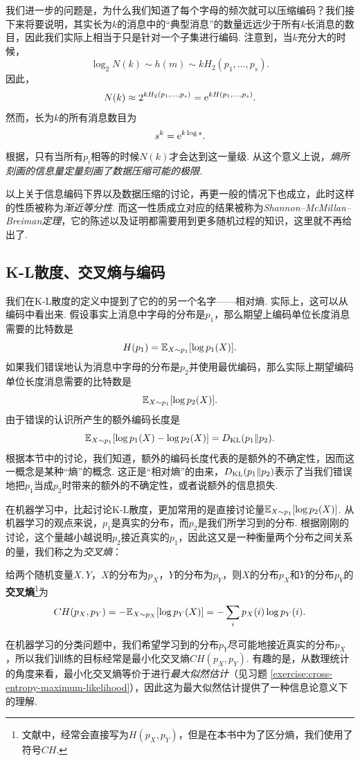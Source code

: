 我们进一步的问题是，为什么我们知道了每个字母的频次就可以压缩编码？我们接下来将要说明，其实长为$k$的消息中的“典型消息”的数量远远少于所有$k$长消息的数目，因此我们实际上相当于只是针对一个子集进行编码. 注意到，当$k$充分大的时候，
\[\log_2 N(k)\sim h(m)\sim kH_2(p_1,\dots,p_s).\]
因此，
\[N(k)\approx 2^{kH_2(p_1,\dots,p_s)}=\mathrm{e}^{kH(p_1,\dots,p_s)}.\]
然而，长为$k$的所有消息数目为
\[s^k=\mathrm{e}^{k\log s}.\]
根据，只有当所有$p_i$相等的时候$N(k)$才会达到这一量级. 从这个意义上说，\textit{熵所刻画的信息量定量刻画了数据压缩可能的极限.}

以上关于信息编码下界以及数据压缩的讨论，再更一般的情况下也成立，此时这样的性质被称为\textit{渐近等分性}. 而这一性质成立对应的结果被称为\textit{Shannon–McMillan–Breiman定理}，它的陈述以及证明都需要用到更多随机过程的知识，这里就不再给出了.

\subsection{K-L散度、交叉熵与编码}

我们在K-L散度的定义中提到了它的的另一个名字——相对熵. 实际上，这可以从编码中看出来. 假设事实上消息中字母的分布是$p_1$，那么期望上编码单位长度消息需要的比特数是
\[H(p_1)=\mathbb{E}_{X\sim p_1}[\log p_1(X)].\] 
如果我们错误地认为消息中字母的分布是$p_2$并使用最优编码，那么实际上期望编码单位长度消息需要的比特数是
\[\mathbb{E}_{X\sim p_1}[\log p_2(X)].\]
由于错误的认识所产生的额外编码长度是
\[\mathbb{E}_{X\sim p_1}[\log p_1(X)-\log p_2(X)]=D_{\mathrm{KL}}(p_1\Vert p_2).\]
根据本节中的讨论，我们知道，额外的编码长度代表的是额外的不确定性，因而这一概念是某种“熵”的概念. 这正是“相对熵”的由来，$D_{\mathrm{KL}}(p_1\Vert p_2)$表示了当我们错误地把$p_1$当成$p_2$时带来的额外的不确定性，或者说额外的信息损失.

在机器学习中，比起讨论K-L散度，更加常用的是直接讨论量$\mathbb{E}_{X\sim p_1}[\log p_2(X)]$. 从机器学习的观点来说，$p_1$是真实的分布，而$p_2$是我们所学习到的分布. 根据刚刚的讨论，这个量越小越说明$p_2$接近真实的$p_1$，因此这又是一种衡量两个分布之间关系的量，我们称之为\textit{交叉熵}：
\begin{definition}[交叉熵]
给两个随机变量$X,Y$，$X$的分布为$p_X$，$Y$的分布为$p_Y$，则$X$的分布$p_X$和$Y$的分布$p_Y$的\textbf{交叉熵}\footnote{文献中，经常会直接写为$H(p_X,p_Y)$，但是在本书中为了区分熵，我们使用了符号$CH$.}为
\[CH(p_X,p_Y)=-\mathbb{E}_{X\sim p_X}[\log p_Y(X)]=-\sum_ip_X(i)\log p_Y(i).\]
\end{definition}

在机器学习的分类问题中，我们希望学习到的分布$p_Y$尽可能地接近真实的分布$p_X$，所以我们训练的目标经常是最小化交叉熵$CH(p_X,p_Y)$. 有趣的是，从数理统计的角度来看，最小化交叉熵等价于进行\textit{最大似然估计}（见习题 \ref{exercise:cross-entropy-maximum-likelihood}），因此这为最大似然估计提供了一种信息论意义下的理解.

